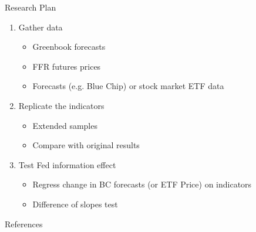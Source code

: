 \documentclass[xcolor=dvipsnames, compress, t]{beamer}
\begin{document}
	\begin{frame}{Research Plan}
		\begin{enumerate}
			\item Gather data
			\begin{itemize}
				\item<2-> Greenbook forecasts 
				\item<3-> FFR futures prices
				\item<4-> Forecasts (e.g. Blue Chip) or stock market ETF data
			\end{itemize}
			\item<5-> Replicate the indicators 
			\begin{itemize}
				\item<6-> Extended samples
				\item<7-> Compare with original results 
			\end{itemize}
			\item<8-> Test Fed information effect
			\begin{itemize}
				\item<9-> Regress change in BC forecasts (or ETF Price) on indicators
				\item<10-> Difference of slopes test 
			\end{itemize}
		\end{enumerate}
	\end{frame}
	\begin{frame}{References}
		\bibbysection
	\end{frame}
\end{document}
